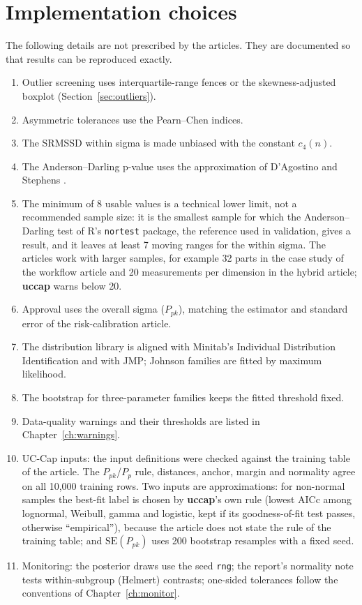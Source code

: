 \documentclass[a4paper,11pt,oneside,openany,parskip=half-,headings=standardclasses,toc=flat,numbers=noenddot]{scrbook}
\newcommand{\code}[1]{\texttt{\begingroup\def\_{\textunderscore\allowbreak}#1\endgroup}}
\newcommand{\pkg}{\textsf{\bfseries uccap}}
\newcommand{\secref}[1]{Section~\ref{#1}}
\newcommand{\chapref}[1]{Chapter~\ref{#1}}
\begin{document}
\section{Implementation choices}\label{sec:choices}

The following details are not prescribed by the articles. They are documented so that results can be reproduced
exactly.

\begin{enumerate}[label=\textbf{\arabic*.},leftmargin=1.8em,itemsep=0.5ex]
\item Outlier screening uses interquartile-range fences or the skewness-adjusted boxplot (\secref{sec:outliers}).
\item Asymmetric tolerances use the Pearn--Chen indices.
\item The SRMSSD within sigma is made unbiased with the constant $c_4(n)$.
\item The Anderson--Darling p-value uses the approximation of D'Agostino and Stephens \cite{dagostino-stephens}.
\item The minimum of 8 usable values is a technical lower limit, not a recommended sample size: it is the smallest
  sample for which the Anderson--Darling test of R's \code{nortest} package, the reference used in validation, gives a
  result, and it leaves at least 7 moving ranges for the within sigma. The articles work with larger samples, for
  example 32 parts in the case study of the workflow article and 20 measurements per dimension in the hybrid
  article; \pkg{} warns below 20.
\item Approval uses the overall sigma ($P_{pk}$), matching the estimator and standard error of the risk-calibration article.
\item The distribution library is aligned with Minitab's Individual Distribution Identification and with JMP; Johnson families are fitted by maximum likelihood.
\item The bootstrap for three-parameter families keeps the fitted threshold fixed.
\item Data-quality warnings and their thresholds are listed in \chapref{ch:warnings}.
\item UC-Cap inputs: the input definitions were checked against the training table of the article. The
  $P_{pk}$/$P_p$ rule, distances, anchor, margin and normality agree on all 10,000 training rows. Two inputs are
  approximations: for non-normal samples the best-fit label is chosen by \pkg{}'s own rule (lowest AICc among
  lognormal, Weibull, gamma and logistic, kept if its goodness-of-fit test passes, otherwise ``empirical''),
  because the article does not state the rule of the training table; and $\mathrm{SE}(P_{pk})$ uses 200 bootstrap
  resamples with a fixed seed.
\item Monitoring: the posterior draws use the seed \code{rng}; the report's normality note tests within-subgroup
  (Helmert) contrasts; one-sided tolerances follow the conventions of \chapref{ch:monitor}.
\end{enumerate}
\end{document}

